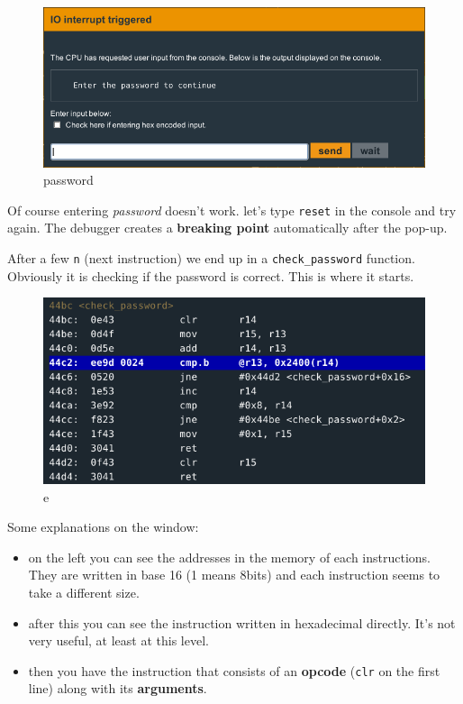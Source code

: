 \documentclass[a4paper,11pt]{article}
\begin{document}
\begin{figure}[htbp]
\centering
\includegraphics{img/1_2.png}
\caption{password}
\end{figure}

Of course entering \emph{password} doesn't work. let's type
\texttt{reset} in the console and try again. The debugger creates a
\textbf{breaking point} automatically after the pop-up.

After a few \texttt{n} (next instruction) we end up in a
\texttt{check\_password} function. Obviously it is checking if the
password is correct. This is where it starts.

\begin{figure}[htbp]
\centering
\includegraphics{img/1_3.png}
\caption{e}
\end{figure}

Some explanations on the window:

\begin{itemize}
\item
  on the left you can see the addresses in the memory of each
  instructions. They are written in base 16 (1 means 8bits) and each
  instruction seems to take a different size.
\item
  after this you can see the instruction written in hexadecimal
  directly. It's not very useful, at least at this level.
\item
  then you have the instruction that consists of an \textbf{opcode}
  (\texttt{clr} on the first line) along with its \textbf{arguments}.
\end{itemize}
\end{document}
